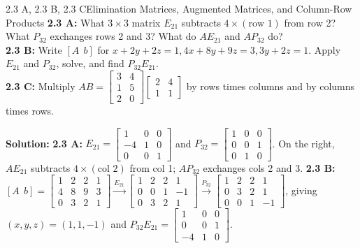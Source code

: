 \documentclass[11pt,a4paper,openany,oneside]{book}
\def\vect#1{#1}%
\def\mathbf#1{#1}%
\newcommand{\vect}[1]{\mathbf{#1}}
\numberwithin{equation}{chapter}
\begin{document}
\begin{example}{2.3 A, 2.3 B, 2.3 C}{Elimination Matrices, Augmented Matrices, and Column-Row Products}
\textbf{2.3 A:} What $3\times 3$ matrix $E_{21}$ subtracts $4\times(\text{row 1})$ from row 2? What $P_{32}$ exchanges rows 2 and 3? What do $AE_{21}$ and $AP_{32}$ do?\\
\textbf{2.3 B:} Write $[A \ \ \vect{b}]$ for $x+2y+2z=1, 4x+8y+9z=3, 3y+2z=1$. Apply $E_{21}$ and $P_{32}$, solve, and find $P_{32}E_{21}$.\\
\textbf{2.3 C:} Multiply $AB = \begin{bmatrix}3 & 4\\1 & 5\\2 & 0\end{bmatrix}\begin{bmatrix}2 & 4\\1 & 1\end{bmatrix}$ by rows times columns and by columns times rows.
\end{example}
\textbf{Solution:}
\textbf{2.3 A:} $E_{21} = \begin{bmatrix}1&0&0\\-4&1&0\\0&0&1\end{bmatrix}$ and $P_{32} = \begin{bmatrix}1&0&0\\0&0&1\\0&1&0\end{bmatrix}$. On the right, $AE_{21}$ subtracts $4\times(\text{col 2})$ from col 1; $AP_{32}$ exchanges cols 2 and 3.
\textbf{2.3 B:} $[A \ \ \vect{b}] = \begin{bmatrix}1&2&2&1\\4&8&9&3\\0&3&2&1\end{bmatrix} \xrightarrow{E_{21}} \begin{bmatrix}1&2&2&1\\0&0&1&-1\\0&3&2&1\end{bmatrix} \xrightarrow{P_{32}} \begin{bmatrix}1&2&2&1\\0&3&2&1\\0&0&1&-1\end{bmatrix}$, giving $(x,y,z) = (1,1,-1)$ and $P_{32}E_{21} = \begin{bmatrix}1&0&0\\0&0&1\\-4&1&0\end{bmatrix}$.
\end{document}
